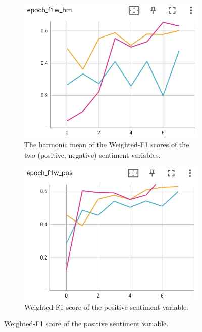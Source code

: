 \begin{figure}
    \centering
    \begin{subfigure}[t]{0.3\textwidth}
        \includegraphics[width=\textwidth]{images/distilbert_val_f1w_hm.png}
        \caption{The harmonic mean of the Weighted-F1 scores of the two (positive, negative) sentiment variables.}
        \label{fig:p2t-val-metrics-hm}
    \end{subfigure}
    \hfill
    \begin{subfigure}[t]{0.3\textwidth}
        \includegraphics[width=\textwidth]{images/distilbert_val_f1w_pos.png}
        \caption{Weighted-F1 score of the positive sentiment variable.}
        \label{fig:p2t-val-metrics-pos}

\end{subfigure}
\end{figure}
